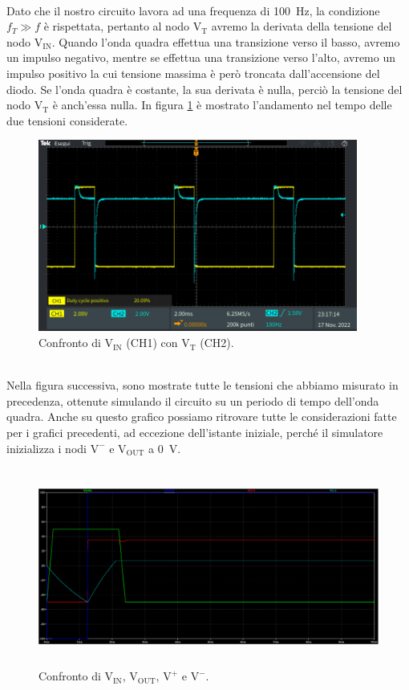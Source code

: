 \documentclass{report}
\begin{document}
\\[8pt]Dato che il nostro circuito lavora ad una frequenza di \SI{100}{\hertz}, la condizione $f_T\gg f$ è rispettata, pertanto al nodo $\mathrm{V_T}$ avremo la derivata della tensione del nodo $\mathrm{V_{IN}}$. Quando l'onda quadra effettua una transizione verso il basso, avremo un impulso negativo, mentre se effettua una transizione verso l'alto, avremo un impulso positivo la cui tensione massima è però troncata dall'accensione del diodo. Se l'onda quadra è costante, la sua derivata è nulla, perciò la tensione del nodo $\mathrm{V_T}$ è anch'essa nulla. In figura \ref{figura:TEK00013} è mostrato l'andamento nel tempo delle due tensioni considerate. 
\begin{figure}[h!]
	\centering
	\includegraphics[height=6.3cm]{immagini/TEK00013}
	\caption{Confronto di $\mathrm{V_{IN}}$ (CH1) con $\mathrm{V_T}$ (CH2).}
	\label{figura:TEK00013}
\end{figure}
\\Nella figura successiva, sono mostrate tutte le tensioni che abbiamo misurato in precedenza, ottenute simulando il circuito su un periodo di tempo dell'onda quadra. Anche su questo grafico possiamo ritrovare tutte le considerazioni fatte per i grafici precedenti, ad eccezione dell'istante iniziale, perché il simulatore inizializza i nodi $\mathrm{V^-}$ e $\mathrm{V_{OUT}}$ a \SI{0}{\volt}. 
\begin{figure}[h!]
	\centering
	\includegraphics[height=6.5cm]{immagini/plot_sim_2} 
	\caption{Confronto di $\mathrm{V_{IN}}$, $\mathrm{V_{OUT}}$, $\mathrm{V^+}$ e $\mathrm{V^-}$.}
	\label{figura:simulazione}
\end{figure}
\end{document}
